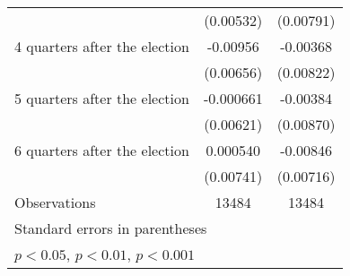 \begin{table}[htbp]
\begin{tabular}{l*{2}{c}}
                    &   (0.00532)         &   (0.00791)         \\
[1em]
 4 quarters after the election&    -0.00956         &    -0.00368         \\
                    &   (0.00656)         &   (0.00822)         \\
[1em]
 5 quarters after the election&   -0.000661         &    -0.00384         \\
                    &   (0.00621)         &   (0.00870)         \\
[1em]
 6 quarters after the election&    0.000540         &    -0.00846         \\
                    &   (0.00741)         &   (0.00716)         \\
\hline
Observations        &       13484         &       13484         \\
\hline\hline
\multicolumn{3}{l}{\footnotesize Standard errors in parentheses}\\
\multicolumn{3}{l}{\footnotesize \sym{*} \(p<0.05\), \sym{**} \(p<0.01\), \sym{***} \(p<0.001\)}\\
\end{tabular}
\end{table}
